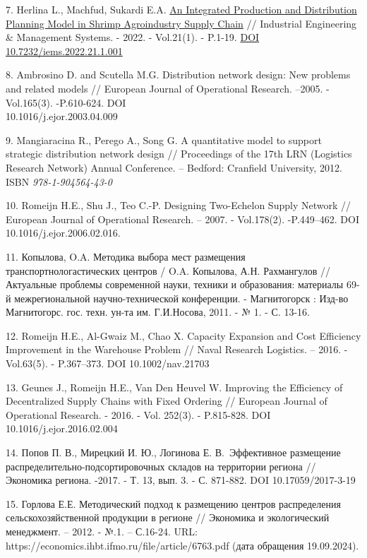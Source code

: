 \begin{references}
7. Herlina L., Machfud, Sukardi E.A.
\href{http://www.iemsjl.org/journal/article.php?code=82679}{An
Integrated Production and Distribution Planning Model in Shrimp
Agroindustry Supply Chain} // Industrial Engineering \& Management
Systems. - 2022. - Vol.21(1). - P.1-19.
\href{https://doi.org/10.7232/iems.2022.21.1.001}{DOI
10.7232/iems.2022.21.1.001}

8. Ambrosino D. and Scutella M.G. Distribution network design: New
problems and related models // European Journal of Operational
Research. --2005. -Vol.165(3). -P.610-624. DOI\\
10.1016/j.ejor.2003.04.009

9. Mangiaracina R., Perego A., Song G. A quantitative model to support
strategic distribution network design // Proceedings of the 17th LRN
(Logistics Research Network) Annual Conference. -- Bedford: Cranfield
University, 2012. ISBN \emph{978-1-904564-43-0}

10. Romeijn H.E., Shu J., Teo C.-P. Designing Two-Echelon Supply Network
// European Journal of Operational Research. -- 2007. - Vol.178(2).
-P.449--462. DOI 10.1016/j.ejor.2006.02.016.

11. Копылова, O.A. Методика выбора мест размещения
транспортнологастических центров / O.A. Копылова, А.Н. Рахмангулов //
Актуальные проблемы современной науки, техники и образования:
материалы 69-й межрегиональной научно-технической конференции. -
Магнитогорск : Изд-во Магнитогорс. гос. техн. ун-та им. Г.И.Носова,
2011. - № 1. - С. 13-16.

12. Romeijn H.E., Al-Gwaiz M., Chao X. Capacity Expansion and Cost
Efficiency Improvement in the Warehouse Problem // Naval Research
Logistics. -- 2016. - Vol.63(5). - P.367--373. DOI 10.1002/nav.21703

13. Geunes J., Romeijn H.E., Van Den Heuvel W. Improving the Efficiency of
Decentralized Supply Chains with Fixed Ordering // European Journal of
Operational Research. - 2016. - Vol. 252(3). - P.815-828. DOI
10.1016/j.ejor.2016.02.004

14. Попов П. В., Мирецкий И. Ю., Логинова Е. В.~Эффективное размещение
распределительно-подсортировочных складов на территории региона //
Экономика региона. -2017. - Т. 13, вып. 3. - С. 871-882. DOI
10.17059/2017-3-19

15. Горлова Е.Е. Методический подход к размещению центров распределения
сельскохозяйственной продукции в регионе // Экономика и экологический
менеджмент. -- 2012. - №.1. -- С.16-24. URL:
https://economics.ihbt.ifmo.ru/file/article/6763.pdf (дата обращения
19.09.2024).


\end{references}
